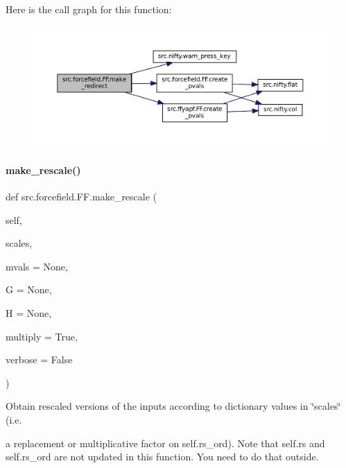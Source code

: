 Here is the call graph for this function\+:
\nopagebreak
\begin{figure}[H]
\begin{center}
\leavevmode
\includegraphics[width=350pt]{classsrc_1_1forcefield_1_1FF_abba6f0f0234c8d256bf991fefdd4f0a5_cgraph}
\end{center}
\end{figure}
\mbox{\label{classsrc_1_1forcefield_1_1FF_ad677189d9a50ed30eaca7e85094ff19a}} 
\paragraph{\texorpdfstring{make\+\_\+rescale()}{make\_rescale()}}
{\footnotesize\ttfamily def src.\+forcefield.\+F\+F.\+make\+\_\+rescale (\begin{DoxyParamCaption}\item[{}]{self,  }\item[{}]{scales,  }\item[{}]{mvals = {\ttfamily None},  }\item[{}]{G = {\ttfamily None},  }\item[{}]{H = {\ttfamily None},  }\item[{}]{multiply = {\ttfamily True},  }\item[{}]{verbose = {\ttfamily False} }\end{DoxyParamCaption})}



Obtain rescaled versions of the inputs according to dictionary values in \char`\"{}scales\char`\"{} (i.\+e. 

a replacement or multiplicative factor on self.\+rs\+\_\+ord). Note that self.\+rs and self.\+rs\+\_\+ord are not updated in this function. You need to do that outside.

